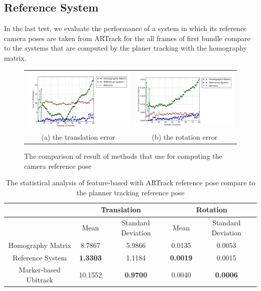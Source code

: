 \subsection{Reference System}
In the last test, we evaluate the performance of a system in which its reference camera poses are taken from ARTrack for the all frames of first bundle compare to the systems that are computed by the planer tracking with the homography matrix.
\begin{figure}[H]
\begin{tabular}{cc}
  \includegraphics[width=80mm]{figures/homo/graph_translation} &  \includegraphics[width=80mm]{figures/homo/graph_rotation} \\
	(a) the translation error & (b) the rotation error \\[6pt]
\end{tabular}
\caption{The comparison of result of methods that use for computing the camera reference pose }\label{fig:diff_reference}
\end{figure}

\begin{table}[H]
\centering
  \begin{tabular}{| c || c | c | c | c |}
      \hline
      & \multicolumn{2}{c|}{Translation} & \multicolumn{2}{c|}{Rotation} \\ \hline
       & Mean & Standard Deviation & Mean & Standard Deviation \\ \hline
      Homography Matrix & 8.7867 & 5.9866 & 0.0135 & 0.0053 \\ \hline
      Reference System & \textbf{1.3303} & 1.1184 & \textbf{0.0019} & 0.0015 \\ \hline
      Marker-based Ubitrack & 10.1552 & \textbf{0.9700} & 0.0040 & \textbf{0.0006} \\ \hline
  \end{tabular}
  \caption{The statistical analysis of feature-based with ARTrack reference pose compare to the planner tracking reference pose} \label{tab:test_global_threshold}
\end{table}